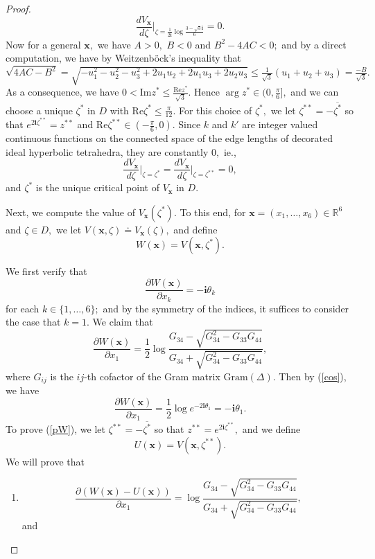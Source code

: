 \documentclass[11pt]{article}
\theoremstyle{remark}
\theoremstyle{remark}
\numberwithin{equation}{section}
\begin{document}
\begin{proof}
$$\frac{d V_{\boldsymbol x}}{d\zeta}\Big|_{\zeta=\frac{1}{2\mathbf i}\log \frac{3-\sqrt{3}\mathbf i}{6}}=0.$$ 
Now for a general $\boldsymbol x,$  we have $A>0,$ $B<0$ and $B^2-4AC<0;$ and by a direct computation, we have by Weitzenb\"ock's inequality that  $\sqrt{4AC-B^2}=\sqrt{-u_1^2-u_2^2-u_3^2+2u_1u_2+2u_1u_3+2u_2u_3}\leqslant \frac{1}{\sqrt{3}}(u_1+u_2+u_3)=\frac{-B}{\sqrt 3}.$ As a consequence, we have $0<\mathrm{Im}z^*\leqslant \frac{\mathrm{Re}z^*}{\sqrt{3}}.$ Hence $\arg z^* \in (0,\frac{\pi}{6}],$ and  we can choose a unique $\zeta^*$ in $D$ with $\mathrm{Re}\zeta^*\leqslant \frac{\pi}{12}.$  For this choice of $\zeta^*,$ we let $\zeta^{**}=-\overline{\zeta^*}$ so that $e^{2\mathbf i\zeta^{**}}=z^{**}$ and $\mathrm{Re}\zeta^{**}\in (-\frac{\pi}{6},0).$
Since $k$ and $k'$ are integer valued continuous functions on the connected space of the edge lengths of decorated ideal hyperbolic tetrahedra, they are constantly $0,$ ie., 
\begin{equation}\label{=0}
\frac{d V_{\boldsymbol x}}{d \zeta}\Big|_{\zeta=\zeta^*}=\frac{d V_{\boldsymbol x}}{d \zeta}\Big|_{\zeta=\zeta^{**}}=0,
\end{equation}
and $\zeta^*$ is the unique critical point of $V_{\boldsymbol x}$ in  $D.$
\bigskip

Next, we compute the value of  $V_{\boldsymbol x}(\zeta^*).$ To this end, for $\boldsymbol x=(x_1,\dots,x_6)\in \mathbb R^6$ and $\zeta\in D,$ we let 
$V(\boldsymbol x,\zeta)\doteq V_{\boldsymbol x}(\zeta),$ and define 
\begin{equation}\label{W}
W(\boldsymbol x)=V({\boldsymbol x},\zeta^*).
\end{equation}

We first verify that 
\begin{equation}\label{co-sch2}
    \frac{\partial W(\boldsymbol x)}{\partial x_k}=-\mathbf i\theta_k
\end{equation}
for each $k\in\{1,\dots,6\};$ and by the symmetry of the indices, it suffices to consider the case that $k=1.$ 
We claim that 
\begin{equation}\label{pW}
\frac{\partial W(\boldsymbol x)}{\partial x_1}=\frac{1}{2}\log\frac{G_{34}-\sqrt{G_{34}^2-G_{33}G_{44}}}{G_{34}+\sqrt{G_{34}^2-G_{33}G_{44}}},
\end{equation}
where $G_{ij}$ is the $ij$-th cofactor of the Gram matrix $\mathrm{Gram}(\Delta).$ Then by (\ref{cos}), we have 
$$\frac{\partial W(\boldsymbol x)}{\partial x_1}=\frac{1}{2}\log e^{-2\mathbf i\theta_1}=-\mathbf i\theta_1.$$
To prove (\ref{pW}), we let $\zeta^{**}=-\overline {\zeta^*}$ so that $z^{**}=e^{2\mathbf i\zeta^{**}},$ and we define 
$$U(\boldsymbol x)= V(\boldsymbol x,\zeta^{**}).$$
We  will prove that 
\begin{enumerate}[(1)]
    \item  
    $$\frac{\partial (W(\boldsymbol x)-U(\boldsymbol x))}{\partial x_1}=\log\frac{G_{34}-\sqrt{G_{34}^2-G_{33}G_{44}}}{G_{34}+\sqrt{G_{34}^2-G_{33}G_{44}}},$$
    and 


\end{enumerate}
\end{proof}
\end{document}
